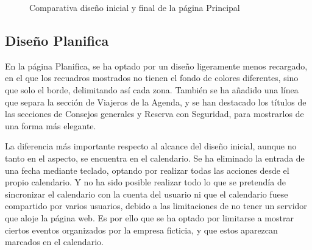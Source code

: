 \documentclass[11pt, a4paper]{book}
\begin{document}
\begin{figure} [H]
\begin{minipage}[c]{0.45\textwidth}
		\end{minipage}
		\caption{Comparativa diseño inicial y final de la página Principal}
	\end{figure}
	
	
	\subsection{Diseño Planifica}
	
	En la página Planifica, se ha optado por un diseño ligeramente menos recargado, en el que los recuadros mostrados no tienen el fondo de colores diferentes, sino que solo el borde, delimitando así cada zona. También se ha añadido una línea que separa la sección de Viajeros de la Agenda, y se han destacado los títulos de las secciones de Consejos generales y Reserva con Seguridad, para mostrarlos de una forma más elegante.
	
	La diferencia más importante respecto al alcance del diseño inicial, aunque no tanto en el aspecto, se encuentra en el calendario. Se ha eliminado la entrada de una fecha mediante teclado, optando por realizar todas las acciones desde el propio calendario. Y no ha sido posible realizar todo lo que se pretendía de sincronizar el calendario con la cuenta del usuario ni que el calendario fuese compartido por varios usuarios, debido a las limitaciones de no tener un servidor que aloje la página web. Es por ello que se ha optado por limitarse a mostrar ciertos eventos organizados por la empresa ficticia, y que estos aparezcan marcados en el calendario.
	
\end{document}
